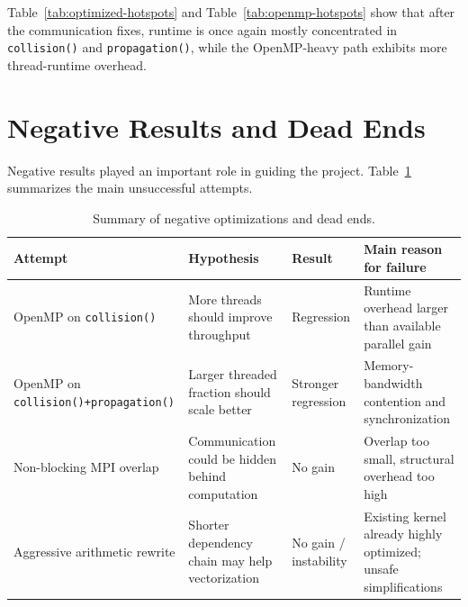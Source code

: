 \documentclass[11pt,a4paper]{article}
\begin{document}
Table~\ref{tab:optimized-hotspots} and Table~\ref{tab:openmp-hotspots} show that after the communication fixes, runtime is once again mostly concentrated in \texttt{collision()} and \texttt{propagation()}, while the OpenMP-heavy path exhibits more thread-runtime overhead.

\begin{table}[H]
  \centering
  \caption{Hotspot distribution for the optimized MPI-oriented configuration \texttt{v12-np2-omp1}.}
  \label{tab:optimized-hotspots}
  
\end{table}

\begin{table}[H]
  \centering
  \caption{Hotspot distribution for the OpenMP-heavy configuration \texttt{v9-np1-omp8}.}
  \label{tab:openmp-hotspots}
  
\end{table}

\section{Negative Results and Dead Ends}

Negative results played an important role in guiding the project. Table~\ref{tab:negative-results} summarizes the main unsuccessful attempts.

\begin{table}[H]
  \centering
  \caption{Summary of negative optimizations and dead ends.}
  \label{tab:negative-results}
  \begin{tabularx}{\textwidth}{@{}lXlX@{}}
    \toprule
    Attempt & Hypothesis & Result & Main reason for failure \\
    \midrule
    OpenMP on \texttt{collision()} & More threads should improve throughput & Regression & Runtime overhead larger than available parallel gain \\
    OpenMP on \texttt{collision()+propagation()} & Larger threaded fraction should scale better & Stronger regression & Memory-bandwidth contention and synchronization \\
    Non-blocking MPI overlap & Communication could be hidden behind computation & No gain & Overlap too small, structural overhead too high \\
    Aggressive arithmetic rewrite & Shorter dependency chain may help vectorization & No gain / instability & Existing kernel already highly optimized; unsafe simplifications \\
    \bottomrule
  \end{tabularx}
\end{table}
\end{document}
